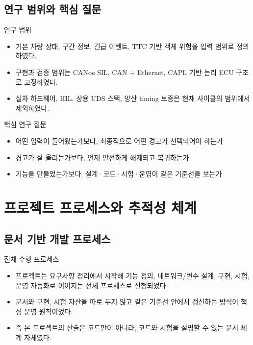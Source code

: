 \documentclass[aspectratio=169,10pt]{beamer}
\begin{document}
\subsection{연구 범위와 핵심 질문}
\begin{frame}{연구 범위}
\begin{itemize}
  \item 기본 차량 상태, 구간 정보, 긴급 이벤트, TTC 기반 객체 위험을 입력 범위로 정의하였다.
  \item 구현과 검증 범위는 CANoe SIL, CAN + Ethernet, CAPL 기반 논리 ECU 구조로 고정하였다.
  \item 실차 하드웨어, HIL, 상용 UDS 스택, 양산 timing 보증은 현재 사이클의 범위에서 제외하였다.
\end{itemize}
\end{frame}

\begin{frame}{핵심 연구 질문}
\begin{itemize}
  \item 어떤 입력이 들어왔는가보다, 최종적으로 어떤 경고가 선택되어야 하는가
  \item 경고가 잘 울리는가보다, 언제 안전하게 해제되고 복귀하는가
  \item 기능을 만들었는가보다, 설계·코드·시험·운영이 같은 기준선을 보는가
\end{itemize}
\end{frame}

\section{프로젝트 프로세스와 추적성 체계}
\subsection{문서 기반 개발 프로세스}

\begin{frame}{전체 수행 프로세스}
\begin{itemize}
  \item 프로젝트는 요구사항 정리에서 시작해 기능 정의, 네트워크/변수 설계, 구현, 시험, 운영 자동화로 이어지는 전체 프로세스로 진행되었다.
  \item 문서와 구현, 시험 자산을 따로 두지 않고 같은 기준선 안에서 갱신하는 방식이 핵심 운영 원칙이었다.
  \item 즉 본 프로젝트의 산출은 코드만이 아니라, 코드와 시험을 설명할 수 있는 문서 체계 자체였다.
\end{itemize}
\end{frame}
\end{document}
